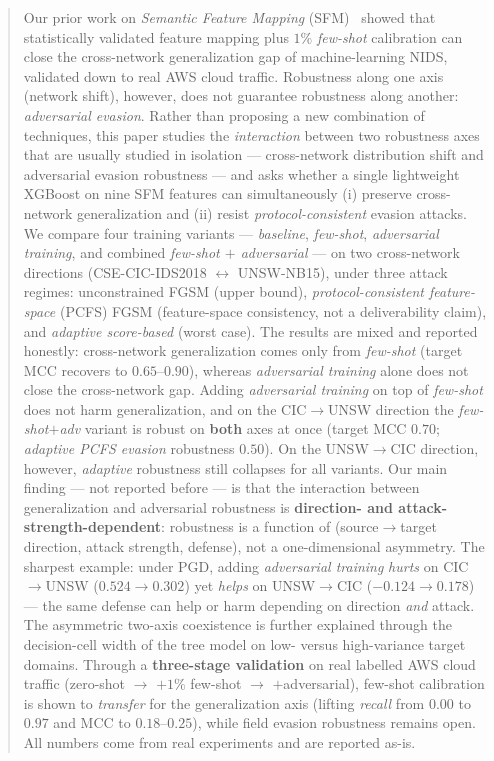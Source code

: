 \documentclass[preprint,12pt,authoryear]{elsarticle}
\begin{document}
\begin{frontmatter}
\begin{abstract}
Our prior work on \emph{Semantic Feature Mapping} (SFM)~\citep{martono2024sfm}
showed that statistically validated feature mapping plus $1\%$ \emph{few-shot}
calibration can close the cross-network generalization gap of machine-learning
NIDS, validated down to real AWS cloud traffic. Robustness along one axis
(network shift), however, does not guarantee robustness along another:
\emph{adversarial evasion}. Rather than proposing a new combination of techniques,
this paper studies the \emph{interaction} between two robustness axes that are
usually studied in isolation --- cross-network distribution shift and adversarial
evasion robustness --- and asks whether a single lightweight XGBoost on nine SFM
features can simultaneously (i) preserve cross-network generalization and (ii)
resist \emph{protocol-consistent} evasion attacks. We compare four training
variants --- \emph{baseline}, \emph{few-shot}, \emph{adversarial training}, and
combined \emph{few-shot $+$ adversarial} --- on two cross-network directions
(CSE-CIC-IDS2018 $\leftrightarrow$ UNSW-NB15), under three attack regimes:
unconstrained FGSM (upper bound), \emph{protocol-consistent feature-space} (PCFS)
FGSM (feature-space consistency, not a deliverability claim), and
\emph{adaptive score-based} (worst case). The results are mixed and reported
honestly: cross-network generalization comes only from \emph{few-shot} (target MCC
recovers to $0.65$--$0.90$), whereas \emph{adversarial training} alone does not
close the cross-network gap. Adding \emph{adversarial training} on top of
\emph{few-shot} does not harm generalization, and on the CIC$\rightarrow$UNSW
direction the \emph{few-shot$+$adv} variant is robust on \textbf{both} axes at once
(target MCC $0.70$; \emph{adaptive PCFS evasion} robustness $0.50$). On the
UNSW$\rightarrow$CIC direction, however, \emph{adaptive} robustness still collapses
for all variants. Our main finding --- not reported before --- is that the interaction between
generalization and adversarial robustness is \textbf{direction- and
attack-strength-dependent}: robustness is a function of (source$\rightarrow$target
direction, attack strength, defense), not a one-dimensional asymmetry. The sharpest
example: under PGD, adding \emph{adversarial training} \emph{hurts} on
CIC$\rightarrow$UNSW ($0.524\rightarrow0.302$) yet \emph{helps} on
UNSW$\rightarrow$CIC ($-0.124\rightarrow0.178$) --- the same defense can help or harm
depending on direction \emph{and} attack. The asymmetric two-axis coexistence is
further explained through the decision-cell width of the tree model on low- versus
high-variance target domains. Through a \textbf{three-stage validation} on real labelled AWS cloud
traffic (zero-shot $\rightarrow$ $+1\%$ few-shot $\rightarrow$ $+$adversarial),
few-shot calibration is shown to \emph{transfer} for the generalization axis
(lifting \emph{recall} from $0.00$ to $0.97$ and MCC to $0.18$--$0.25$), while
field evasion robustness remains open. All numbers come from real experiments and
are reported as-is.
\end{abstract}


\end{frontmatter}
\end{document}
